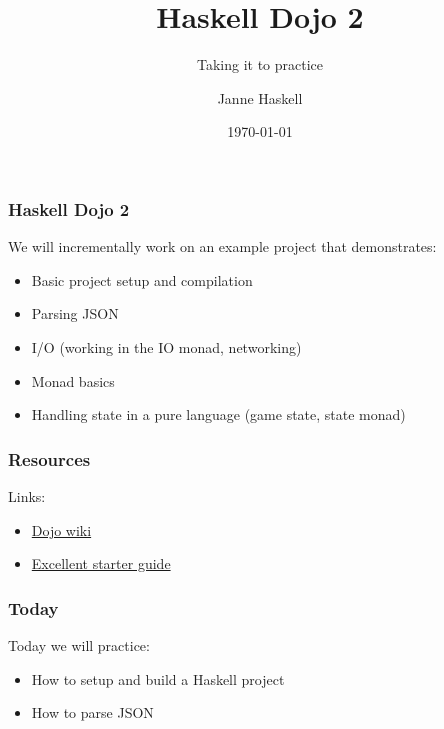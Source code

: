 \documentclass{beamer}
\title{Haskell Dojo 2}
\subtitle{Taking it to practice}
\date{\today}
\author{Janne Haskell}
\begin{document}
\frame{\titlepage}

\begin{frame}[fragile]

\frametitle{Haskell Dojo 2}

We will incrementally work on an example project that demonstrates:

\begin{itemize}
  \item Basic project setup and compilation
  \item Parsing JSON
  \item I/O (working in the IO monad, networking)
  \item Monad basics
  \item Handling state in a pure language (game state, state monad)
\end{itemize}

\end{frame}

\begin{frame}[fragile]
\frametitle{Resources}

Links:

\begin{itemize}
  \item \href{https://github.com/nurpax/haskell-dojo/wiki/Haskell-Dojo-\%232}{Dojo wiki}
  \item \href{http://www.haskell.org/haskellwiki/How_to_write_a_Haskell_program}{Excellent starter guide}
\end{itemize}

\end{frame}

\begin{frame}[fragile]

\frametitle{Today}

Today we will practice:

\begin{itemize}
  \item How to setup and build a Haskell project
  \item How to parse JSON
\end{itemize}

\end{frame}
\end{document}
